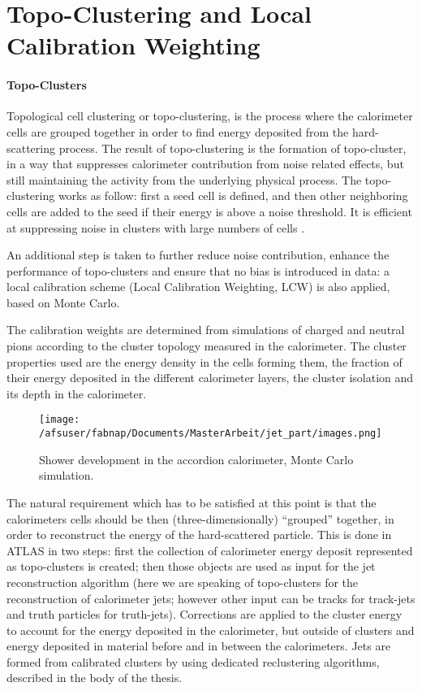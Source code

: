 \chapter{Topo-Clustering and Local Calibration Weighting}
\subsubsection{Topo-Clusters}
Topological cell clustering or topo-clustering, is the process where the calorimeter cells are grouped together in order to find energy deposited from the hard-scattering process. The result of topo-clustering is the formation of topo-cluster, in a way that suppresses calorimeter contribution from noise related effects, but still maintaining the activity from the underlying physical process.
The topo-clustering works as follow: first a seed cell is defined, and then other neighboring cells are added to the seed if their energy is above a noise threshold. 
It is efficient at suppressing noise in clusters with large numbers of cells \cite{topocluster}. 

An additional step is taken to further reduce noise contribution, enhance the performance of topo-clusters and ensure that no bias is introduced in data: a local calibration scheme (Local Calibration Weighting, LCW) \cite{lcw} is also applied, based on Monte Carlo.

The calibration weights are determined from simulations of charged and neutral pions according to the cluster topology measured in the calorimeter. The cluster properties
used are the energy density in the cells forming them, the fraction of their energy deposited in the different calorimeter layers, the cluster isolation and its depth in the calorimeter.
\begin{wrapfigure}{R}{0.5\textwidth}
  \centering
\texttt{[image: /afsuser/fabnap/Documents/MasterArbeit/jet\_part/images.png]}
  \caption[Shower development in the accordion calorimeter]{Shower development in the accordion calorimeter, Monte Carlo simulation.}
  \label{fig:accordion}
\end{wrapfigure}
The natural requirement which has to be satisfied at this point is that the calorimeters cells should be then (three-dimensionally) ``grouped'' together, in order to reconstruct the energy of the hard-scattered particle. This is done in ATLAS in two steps: first the collection of calorimeter energy deposit represented as topo-clusters is created; then those objects are used as input for the jet reconstruction algorithm (here we are speaking of topo-clusters for the reconstruction of calorimeter jets; however other input can be tracks for track-jets and truth particles for truth-jets). 
Corrections are applied to the cluster energy to account for the energy deposited in the calorimeter, but outside of clusters and energy deposited in material before and in between the calorimeters. Jets are formed from calibrated clusters by using dedicated reclustering algorithms, described in the body of the thesis.

